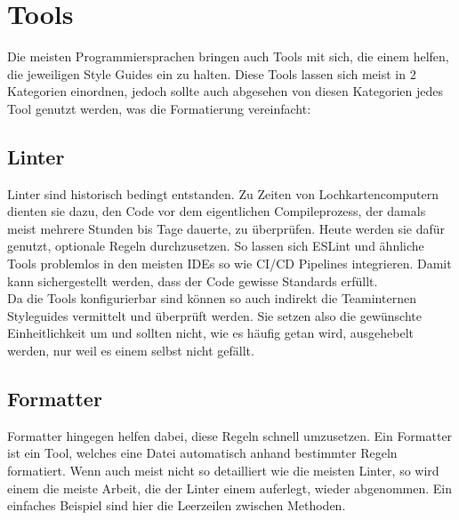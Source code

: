 \section{Tools}
    Die meisten Programmiersprachen bringen auch Tools mit sich, die einem helfen, die jeweiligen Style Guides ein zu halten.
    Diese Tools lassen sich meist in 2 Kategorien einordnen, jedoch sollte auch abgesehen von diesen Kategorien jedes Tool genutzt werden, was die Formatierung vereinfacht:
    \subsection{Linter}
        Linter sind historisch bedingt entstanden.
        Zu Zeiten von Lochkartencomputern dienten sie dazu, den Code vor dem eigentlichen Compileprozess, der damals meist mehrere Stunden bis Tage dauerte, zu überprüfen.
        Heute werden sie dafür genutzt, optionale Regeln durchzusetzen.
        So lassen sich ESLint und ähnliche Tools problemlos in den meisten IDEs so wie CI/CD Pipelines integrieren.
        Damit kann sichergestellt werden, dass der Code gewisse Standards erfüllt.\\
        Da die Tools konfigurierbar sind können so auch indirekt die Teaminternen Styleguides vermittelt und überprüft werden.
        Sie setzen also die gewünschte Einheitlichkeit um und sollten nicht, wie es häufig getan wird, ausgehebelt werden, nur weil es einem selbst nicht gefällt.

    \subsection{Formatter}
        Formatter hingegen helfen dabei, diese Regeln schnell umzusetzen.
        Ein Formatter ist ein Tool, welches eine Datei automatisch anhand bestimmter Regeln formatiert.
        Wenn auch meist nicht so detailliert wie die meisten Linter, so wird einem die meiste Arbeit, die der Linter einem auferlegt, wieder abgenommen.
        Ein einfaches Beispiel sind hier die Leerzeilen zwischen Methoden.